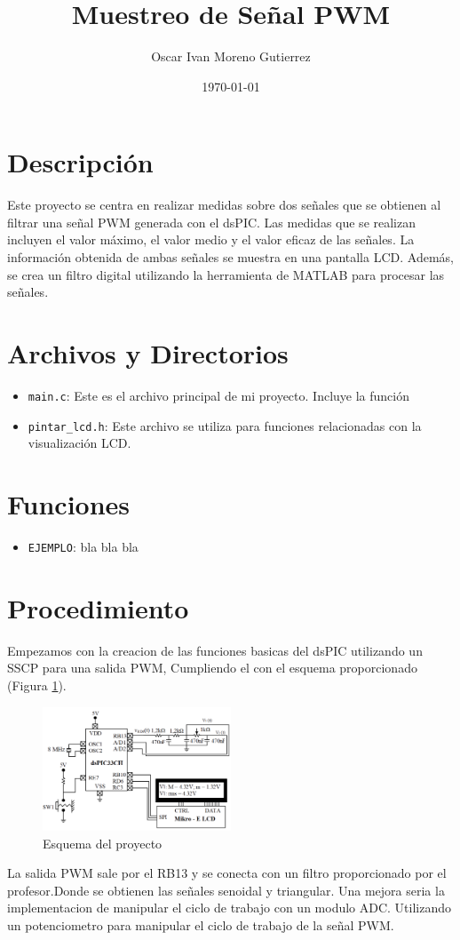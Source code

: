 \documentclass{article}
\title{Muestreo de Señal PWM}
\author{Oscar Ivan Moreno Gutierrez}
\date{\today}
\begin{document}
\maketitle

\section{Descripción}
Este proyecto se centra en realizar medidas sobre dos señales que se obtienen al filtrar una señal PWM generada con el dsPIC. Las medidas que se realizan incluyen el valor máximo, el valor medio y el valor eficaz de las señales. La información obtenida de ambas señales se muestra en una pantalla LCD. Además, se crea un filtro digital utilizando la herramienta de MATLAB para procesar las señales.
\section{Archivos y Directorios}
\begin{itemize}
\item \texttt{main.c}: Este es el archivo principal de mi proyecto. Incluye la función 
\item \texttt{pintar\_lcd.h}: Este archivo se utiliza para funciones relacionadas con la visualización LCD.
\end{itemize}

\section{Funciones}
\begin{itemize}
\item \texttt{EJEMPLO}: bla bla bla
\end{itemize}

\section{Procedimiento}
Empezamos con la creacion de las funciones basicas del dsPIC utilizando un SSCP para una salida PWM, Cumpliendo el con el esquema proporcionado (Figura \ref{fig:esquema}).

\begin{figure}[H]
    \centering
    \includegraphics[width=0.5\textwidth]{images/esquema_og.png} %
    \caption{Esquema del proyecto}
    \label{fig:esquema}
\end{figure}
La salida PWM sale por el RB13 y se conecta con un filtro proporcionado por el profesor.Donde se obtienen las señales senoidal y triangular.
Una mejora seria la implementacion de manipular el ciclo de trabajo con un modulo ADC. Utilizando un potenciometro para manipular el ciclo de trabajo de la señal PWM.
\end{document}
